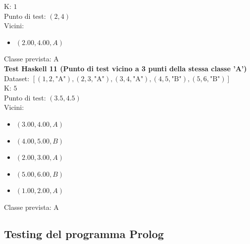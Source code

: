 \documentclass[11pt]{article}
\theoremstyle{definition}
\begin{document}
K: $1$\\
Punto di test: $(2, 4)$\\
Vicini:
\begin{itemize}
\item $(2.00,4.00, A)$
\end{itemize}
Classe prevista: A\\
\newline
\textbf{Test Haskell 11 (Punto di test vicino a 3 punti della stessa classe 'A')}\\
Dataset: $[(1, 2, \text{"A"}), (2, 3, \text{"A"}), (3, 4, \text{"A"}), (4, 5, \text{"B"}), (5, 6, \text{"B"})]$\\
K: $5$\\
Punto di test: $(3.5, 4.5)$\\
Vicini:
\begin{itemize}
\item $(3.00,4.00,A)$
\item $(4.00,5.00,B)$
\item $(2.00,3.00,A)$
\item $(5.00,6.00,B)$
\item $(1.00,2.00,A)$
\end{itemize}
Classe prevista: A

\newpage

\subsection{Testing del programma Prolog}
\end{document}
